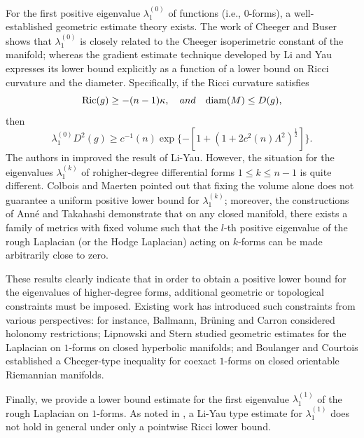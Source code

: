 \documentclass[12pt, twoside]{article}
\theoremstyle{definition}
\numberwithin{equation}{section}
\def \la {\lambda}
\def \La {\Lambda}
\begin{document}
For the first positive eigenvalue $\la_{1}^{(0)}$ of functions (i.e., $0$-forms), a well-established geometric estimate theory exists. 
The work of Cheeger \cite{Cheeger1970} and Buser \cite{Buser1982} shows that 
$\la_{1}^{(0)}$  is closely related to the Cheeger isoperimetric constant of the manifold; 
whereas the gradient estimate technique developed by Li and Yau \cite{Li1980b} expresses its lower bound explicitly as a function of a lower bound on Ricci curvature and the diameter. 
Specifically, if the Ricci curvature satisfies
$$\operatorname{Ric}(g)\geq -(n-1)\kappa,\quad and\quad{\rm{diam}}(M)\leq D(g),$$ 
then
	\begin{equation*}
	\la^{(0)}_{1}D^{2}(g)\geq c^{-1}(n)\exp\{-[1+(1+2c^{2}(n)\La^{2})^{\frac{1}{2} }]\}.
	\end{equation*}	
The authors in \cite{Zhong1984} improved the result of Li-Yau. However, the situation for the eigenvalues $\la_{1}^{(k)}$ of rohigher-degree differential forms $1\leq k\leq n-1$  is quite different.
Colbois and Maerten \cite{Colbois2010} pointed out that fixing the volume alone does not guarantee a uniform positive lower bound for $\la_{1}^{(k)}$; 
moreover, the constructions of Ann\'{e} and Takahashi \cite{Anne2024,Anne2025} demonstrate that on any closed manifold, 
there exists a family of metrics with fixed volume such that the $l$-th positive eigenvalue of the rough Laplacian (or the Hodge Laplacian) acting on $k$-forms can be made arbitrarily close to zero.

These results clearly indicate that in order to obtain a positive lower bound for the eigenvalues of higher-degree forms, additional geometric or topological constraints must be imposed. Existing work has introduced such constraints from various perspectives: for instance, Ballmann, Br\"{u}ning and Carron \cite{Ballmann2003} considered holonomy restrictions; Lipnowski and Stern \cite{Lipnowski2018} studied geometric estimates for the Laplacian on $1$-forms on closed hyperbolic manifolds; and Boulanger and Courtois \cite{Boulanger2022} established a Cheeger-type inequality for coexact $1$-forms on closed orientable Riemannian manifolds.

Finally, we provide a lower bound estimate for the first eigenvalue $\lambda_{1}^{(1)}$ of the rough Laplacian on $1$-forms. 
As noted in \cite[Proposition 1.2]{Huang2025b}, a Li-Yau type estimate for $\lambda_{1}^{(1)}$ does not hold in general under only a pointwise Ricci lower bound.  
\end{document}
